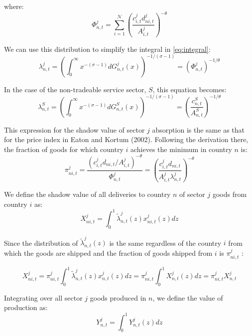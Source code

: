 \documentclass[12pt, bibtotoc, tablecaptionabove, figurecaptionabove, fleqn]{article}
\begin{document}
where:
\begin{equation*}
	\Phi_{n, t}^{j}=\sum_{i=1}^{\mathcal{N}}\left(\frac{c_{i, t}^{j} d_{n i, t}^{j}}{A_{i, t}^{j}}\right)^{-\theta}
\end{equation*}

We can use this distribution to simplify the integral in \ref{eq:integral}:
\begin{equation*}
	\lambda_{n, t}^{j}=\left(\int_{0}^{\infty} x^{-(\sigma-1)} d G_{n, t}^{j}(x)\right)^{-1 /(\sigma-1)}=\left(\Phi_{n, t}^{j}\right)^{-1 / \theta}
\end{equation*}

In the case of the non-tradeable service sector, $S$, this equation becomes:
\begin{equation*}
	\lambda_{n, t}^{S}=\left(\int_{0}^{\infty} x^{-(\sigma-1)} d G_{n, t}^{S}(x)\right)^{-1 /(\sigma-1)}=\left(\frac{c_{n,t}^S}{A^S_{n,t}}\right)^{-1 / \theta}
\end{equation*}


This expression for the shadow value of sector $j$ absorption is the same as that for the price index in Eaton and Kortum (2002). Following the derivation there, the fraction of goods for which country $i$ achieves the minimum in country $n$ is:
\begin{equation*}
\pi_{n i, t}^{j}=\frac{\left(c_{i, t}^{j} d_{n i, t} / A_{i, t}^{j}\right)^{-\theta}}{\Phi_{n, t}^{j}}=\left(\frac{c_{i, t}^{j} d_{n i, t}}{A_{i, t}^{j} \lambda_{n, t}^{j}}\right)^{-\theta}
\end{equation*}

We define the shadow value of all deliveries to country $n$ of sector $j$ goods from country $i$ as:
\begin{equation*}
	X_{n i, t}^{j}=\int_{0}^{1} \tilde{\lambda}_{n, t}^{j}(z) x_{n i, t}^{j}(z) d z
\end{equation*}

Since the distribution of $\tilde{\lambda}_{n, t}^{j}(z)$ is the same regardless of the country $i$ from which the goods are
shipped and the fraction of goods shipped from $i$ is $\pi_{n i, t}^{j}$ :

\begin{equation*}
	X_{n i, t}^{j}=\pi_{n i, t}^{j} \int_{0}^{1} \tilde{\lambda}_{n, t}^{j}(z) x_{n, t}^{j}(z) d z=\pi_{n i, t}^{j} \int_{0}^{1} X_{n, t}^{j}(z) d z=\pi_{n i, t}^{j} X_{n, t}^{j}
\end{equation*}

Integrating over all sector $j$ goods produced in $n$, we define the value of production as:
\begin{equation*}
	Y_{n, t}^{j}=\int_{0}^{1} Y_{n, t}^{j}(z) d z
\end{equation*}
\end{document}
